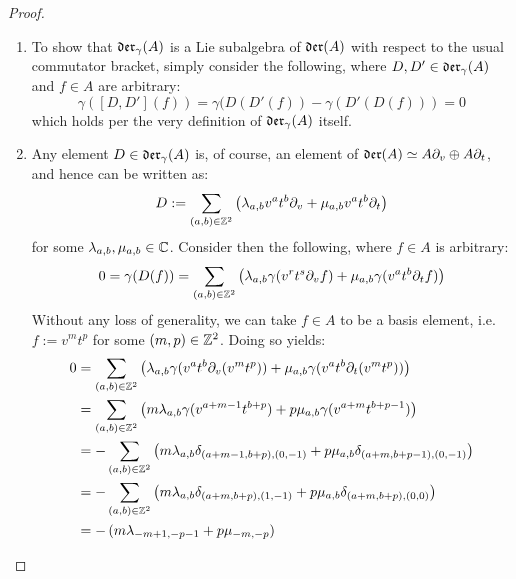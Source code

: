             \begin{proof}
                \begin{enumerate}
                    \item To show that $\mathfrak{der}_{\gamma}(A)$ is a Lie subalgebra of $\mathfrak{der}(A)$ with respect to the usual commutator bracket, simply consider the following, where $D, D' \in \mathfrak{der}_{\gamma}(A)$ and $f \in A$ are arbitrary:
                        $$\gamma( [D, D'](f) ) = \gamma( D(D'(f)) - \gamma( D'(D(f)) ) = 0$$
                    which holds per the very definition of $\mathfrak{der}_{\gamma}(A)$ itself.
                    \item Any element $D \in \mathfrak{der}_{\gamma}(A)$ is, of course, an element of $\mathfrak{der}(A) \simeq A \partial_v \oplus A \partial_t$, and hence can be written as:
                        $$D := \sum_{(a, b) \in \mathbb{Z}^2} \left( \lambda_{a, b} v^a t^b \partial_v + \mu_{a, b} v^a t^b \partial_t \right)$$
                    for some $\lambda_{a, b}, \mu_{a, b} \in \mathbb{C}$. Consider then the following, where $f \in A$ is arbitrary:
                        $$0 =\gamma(D(f)) = \sum_{(a, b) \in \mathbb{Z}^2} \left( \lambda_{a, b} \gamma(v^r t^s \partial_v f) + \mu_{a, b} \gamma(v^a t^b \partial_t f) \right)$$
                    Without any loss of generality, we can take $f \in A$ to be a basis element, i.e. $f := v^m t^p$ for some $(m, p) \in \mathbb{Z}^2$. Doing so yields:
                        $$
                            \begin{aligned}
                                0 & = \sum_{(a, b) \in \mathbb{Z}^2} \left( \lambda_{a, b} \gamma(v^a t^b \partial_v(v^m t^p)) + \mu_{a, b} \gamma(v^a t^b \partial_t(v^m t^p)) \right)
                                \\
                                & = \sum_{(a, b) \in \mathbb{Z}^2} \left( m\lambda_{a, b} \gamma(v^{a + m - 1} t^{b + p}) + p \mu_{a, b} \gamma( v^{a + m} t^{b + p - 1} ) \right)
                                \\
                                & = -\sum_{(a, b) \in \mathbb{Z}^2} \left( m \lambda_{a, b} \delta_{(a + m - 1, b + p), (0, -1)} + p \mu_{a, b} \delta_{(a + m, b + p - 1), (0, -1)} \right)
                                \\
                                & = -\sum_{(a, b) \in \mathbb{Z}^2} \left( m \lambda_{a, b} \delta_{(a + m, b + p), (1, -1)} + p \mu_{a, b} \delta_{(a + m, b + p), (0, 0)} \right)
                                \\
                                & = -\left( m \lambda_{-m + 1, -p - 1} + p \mu_{-m, -p} \right)
                            \end{aligned} 
$$
\end{enumerate}
\end{proof}
